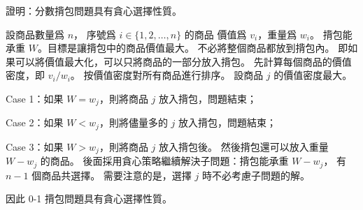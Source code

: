 \startEXERCISE
證明：分數揹包問題具有貪心選擇性質。
\stopEXERCISE

\startANSWER
設商品數量爲 $n$，
序號爲 $i\in \{1,2,\ldots,n\}$ 的商品
價值爲 $v_i$，重量爲 $w_i$。
揹包能承重 $W$。目標是讓揹包中的商品價值最大。
不必將整個商品都放到揹包內。
即如果可以將價值最大化，可以只將商品的一部分放入揹包。
先計算每個商品的價值密度，即 $v_i / w_i$。
按價值密度對所有商品進行排序。
設商品 $j$ 的價值密度最大。

\startigBase[n]
\item Case 1：如果 $W=w_j$，則將商品 $j$ 放入揹包，問題結束；
\item Case 2：如果 $W<w_j$，則將儘量多的 $j$ 放入揹包，問題結束；
\item Case 3：如果 $W>w_j$，則將商品 $j$ 放入揹包後。
然後揹包還可以放入重量 $W-w_j$ 的商品。
後面採用貪心策略繼續解決子問題：揹包能承重 $W-w_j$，
有 $n-1$ 個商品共選擇。
需要注意的是，選擇 $j$ 時不必考慮子問題的解。
\stopigBase

因此 0-1 揹包問題具有貪心選擇性質。
\stopANSWER
